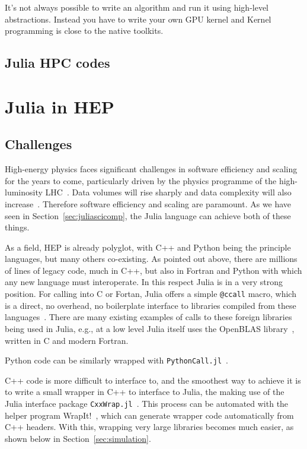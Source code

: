 \documentclass{webofc}
\begin{document}
It's not always possible to write an algorithm and run it using high-level abstractions. Instead you have to write your own GPU kernel and Kernel programming is close to the native toolkits.  

\subsection{Julia HPC codes}

\section{Julia in HEP}

\subsection{Challenges}

High-energy physics faces significant challenges in software efficiency and
scaling for the years to come, particularly driven by the physics programme of
the high-luminosity LHC~\cite{hsfcwp}. Data volumes will rise sharply and data
complexity will also
increase~\cite{CERN-LHCC-2022-005,Software:2815292,Valassi2021}. Therefore
software efficiency and scaling are paramount. As we have seen in
Section~\ref{sec:juliascicomp}, the Julia language can achieve both of these
things.

As a field, HEP is already polyglot, with C++ and Python being the principle
languages, but many others co-existing. As pointed out above, there are millions
of lines of legacy code, much in C++, but also in Fortran and Python with which
any new language must interoperate. In this respect Julia is in a very strong
position. For calling into C or Fortan, Julia offers a simple \texttt{@ccall}
macro, which is a direct, no overhead, no boilerplate interface to libraries
compiled from these languages~\cite{JuliaManualCCall}. There are many existing
examples of calls to these foreign libraries being used in Julia, e.g., at a low
level Julia itself uses the OpenBLAS library~\cite{6877458}, written in C and
modern Fortran. 

Python code can be similarly wrapped with
\texttt{PythonCall.jl}~\cite{PythonCall.jl}.

C++ code is more difficult to interface to, and the smoothest way to achieve it
is to write a small wrapper in C++ to interface to Julia, the making use of the
Julia interface package \texttt{CxxWrap.jl}~\cite{CxxWrap.jl}. This process can
be automated with the helper program WrapIt!~\cite{wrapit-github}, which can
generate wrapper code automatically from C++ headers. With this, wrapping very
large libraries becomes much easier, as shown below in
Section~\ref{sec:simulation}.
\end{document}
